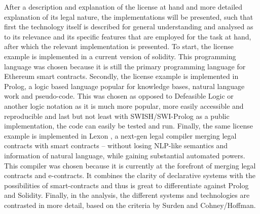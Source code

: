 \documentclass[conference]{IEEEtran}
\begin{document}
After a description and explanation of the license at hand and more detailed explanation of its legal nature, the implementations will be presented, such that first the technology itself is described for general understanding and analysed as to its relevance and its specific features that are employed for the task at hand, after which the relevant implementation is presented.
To start, the license example is implemented in a current version of solidity.  \cite{EthereumSolidity2020} This programming language was chosen because it is still the primary programming language for Ethereum  smart contracts.
Secondly, the license example is implemented in Prolog, \cite{SWIPrologManual} a logic based language popular for knowledge bases, natural language work and pseudo-code. This was chosen as opposed to Defeasible Logic \cite{governatoriLegalContractsImperative2018} or another logic notation as it is much more popular, more easily accessible and reproducible and last but not least with SWISH/SWI-Prolog as a public implementation, the code can easily be tested and run.
Finally, the same license example is implemented in Lexon \cite{LexonTech}, a next-gen legal compiler merging legal contracts with smart contracts %
– without losing NLP-like semantics and information of natural language, while gaining substantial automated powers. This compiler was chosen because it is currently at the forefront of merging legal contracts and e-contracts. It combines the clarity of declarative systems with the possibilities of smart-contracts and thus is great to differentiate against Prolog and Solidity.
Finally, in the analysis, the different systems and technologies are contrasted in more detail, based on the criteria by Surden and Cohney/Hoffman. \cite{cohneyTransactionalScriptsContract2020}
\end{document}
